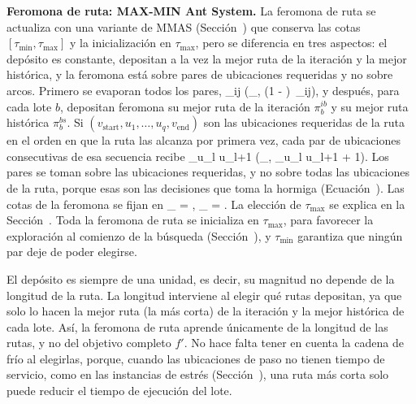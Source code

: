 {\bf Feromona de ruta: MAX-MIN Ant System.} La feromona de ruta se actualiza
con una variante de MMAS (Sección~) que conserva las cotas
$[\tau_{\min}, \tau_{\max}]$ y la inicialización en $\tau_{\max}$, pero se
diferencia en tres aspectos: el depósito es constante, depositan a la vez la
mejor ruta de la iteración y la mejor histórica, y la feromona está sobre
pares de ubicaciones requeridas y no sobre arcos. Primero se evaporan todos los pares,
\startformula
	\tau_{ij} \leftarrow \max\left(\tau_{\min},\; (1 - \rho)\, \tau_{ij}\right),
\stopformula
y después, para cada lote $b$, depositan feromona su mejor ruta de la
iteración $\pi^{ib}_b$ y su mejor ruta histórica $\pi^{bs}_b$. Si
$(v_{\text{start}}, u_1, \dots, u_q, v_{\text{end}})$ son las ubicaciones
requeridas de la ruta en el orden en que la ruta las alcanza por primera
vez, cada par de ubicaciones consecutivas de esa secuencia recibe
\startformula
	\tau_{u_l u_{l+1}} \leftarrow \min\left(\tau_{\max},\; \tau_{u_l u_{l+1}} + 1\right).
\stopformula
Los pares se toman sobre las ubicaciones requeridas, y no sobre todas las
ubicaciones de la ruta, porque esas son las decisiones que toma la hormiga
(Ecuación~). Las cotas de la feromona se fijan en
\startplaceformula[reference=eq:aco_cotas]
\startformula
	\tau_{\max} = , \qquad \tau_{\min} = .
\stopformula
\stopplaceformula
La elección de $\tau_{\max}$ se explica en la
Sección~. Toda la feromona de ruta se inicializa en $\tau_{\max}$, para favorecer la
exploración al comienzo de la búsqueda (Sección~), y
$\tau_{\min}$ garantiza que ningún par deje de poder elegirse.

El depósito es siempre de una unidad, es decir, su magnitud no depende de la
longitud de la ruta. La longitud interviene al elegir qué
rutas depositan, ya que solo lo hacen la mejor ruta (la más corta) de la iteración y la
mejor histórica de cada lote.
Así, la feromona de ruta aprende únicamente de la longitud de las rutas, y
no del objetivo completo $f'$. No hace falta tener en cuenta la cadena de
frío al elegirlas, porque, cuando las ubicaciones de paso no tienen tiempo
de servicio, como en las instancias de estrés
(Sección~), una ruta más corta solo
puede reducir el tiempo de ejecución del lote.

